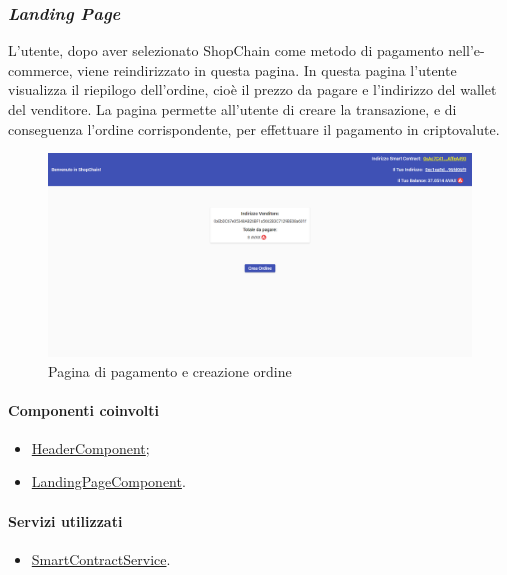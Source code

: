 \newpage

\subsubsection*{\textit{Landing Page}}
L'utente, dopo aver selezionato ShopChain come metodo di pagamento nell'e-commerce, viene reindirizzato in questa pagina. In questa pagina l'utente visualizza il riepilogo dell'ordine, cioè il prezzo da pagare e l'indirizzo del wallet del venditore. La pagina permette all'utente di creare la transazione, e di conseguenza l'ordine corrispondente, per effettuare il pagamento in criptovalute.

\begin{figure}[!h] 
    \centering 
    \includegraphics[width=1\columnwidth]{immagini/maschere/landingpage.png} 
    \caption{Pagina di pagamento e creazione ordine}
\end{figure}

\paragraph{Componenti coinvolti}
\begin{itemize}
    \item \hyperref[sec:header-component]{HeaderComponent};
    \item \hyperref[sec:landing-component]{LandingPageComponent}.
\end{itemize}

\paragraph{Servizi utilizzati}
\begin{itemize}
    \item \hyperref[sec:smart-contract-service]{SmartContractService}.
\end{itemize}

